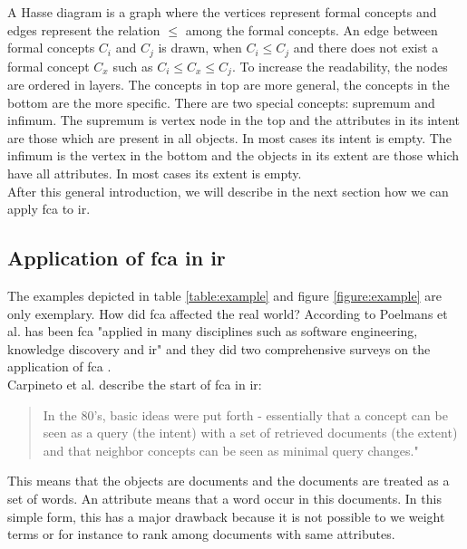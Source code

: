 \documentclass[11pt]{report}
\begin{document}
{{A Hasse diagram is a graph where the vertices represent formal concepts and edges represent the relation $\le$ among the formal concepts. An edge between formal concepts $C_i$ and $C_j$ is drawn, when $C_i \le C_j$ and there does not exist a formal concept $C_x$ such as $C_i \le C_x \le C_j$. To increase the readability, the nodes are ordered in layers. The concepts in top are more general, the concepts in the bottom are the more specific. There are two special concepts: supremum and infimum. The supremum is vertex node in the top and the attributes in its intent are those which are present in all objects. In most cases its intent is empty. The infimum is the vertex in the bottom and the objects in its extent are those which have all attributes. In most cases its extent is empty.\\

After this general introduction, we will describe in the next section how we can apply \acrshort{fca} to \acrshort{ir}.

\subsection{Application of \acrshort{fca} in \acrshort{ir}}

The examples depicted in table \ref{table:example} and figure \ref{figure:example} are only exemplary. How did \acrshort{fca} affected the real world? According to Poelmans et al. has been \acrshort{fca} "applied in many disciplines such as software engineering, knowledge discovery and \acrshort{ir}" \cite{Poelmans2013} and they did two comprehensive surveys on the application of \acrshort{fca} \cite{Poelmans2013, Poelmans2013b}. \\

Carpineto et al.\cite{Carpineto2005} describe the start of \acrshort{fca} in \acrshort{ir}:

\begin{quote}
In the 80's, basic ideas were put forth - essentially that a concept can be seen as a query (the intent) with a set of retrieved documents (the extent) and that neighbor concepts can be seen as minimal query changes."
\end{quote}

This means that the objects are documents and the documents are treated as a set of words. An attribute means that a word occur in this documents. In this simple form, this has a major drawback because it is not possible to we weight terms or for instance to rank among documents with same attributes.\\

}}
\end{document}
